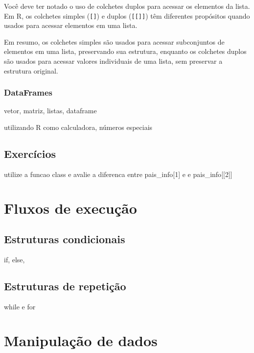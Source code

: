 \documentclass[
  letterpaper,
  DIV=11,
  numbers=noendperiod]{scrreprt}
\begin{document}
Você deve ter notado o uso de colchetes duplos para acessar os elementos
da lista. Em R, os colchetes simples (\texttt{{[}{]}}) e duplos
(\texttt{{[}{[}{]}{]}}) têm diferentes propósitos quando usados para
acessar elementos em uma lista.

Em resumo, os colchetes simples são usados para acessar subconjuntos de
elementos em uma lista, preservando sua estrutura, enquanto os colchetes
duplos são usados para acessar valores individuais de uma lista, sem
preservar a estrutura original.

\hypertarget{dataframes}{%
\subsection{DataFrames}\label{dataframes}}

vetor, matriz, listas, dataframe

utilizando R como calculadora, números especiais

\hypertarget{exercuxedcios}{%
\section{Exercícios}\label{exercuxedcios}}

utilize a funcao class e avalie a diferenca entre pais\_info{[}1{]} e e
pais\_info{[}{[}2{]}{]}

\hypertarget{fluxos-de-execuuxe7uxe3o}{%
\chapter{Fluxos de execução}\label{fluxos-de-execuuxe7uxe3o}}

\hypertarget{estruturas-condicionais}{%
\section{Estruturas condicionais}\label{estruturas-condicionais}}

if, else,

\hypertarget{estruturas-de-repetiuxe7uxe3o}{%
\section{Estruturas de repetição}\label{estruturas-de-repetiuxe7uxe3o}}

while e for

\hypertarget{manipulauxe7uxe3o-de-dados}{%
\chapter{Manipulação de dados}\label{manipulauxe7uxe3o-de-dados}}
\end{document}
